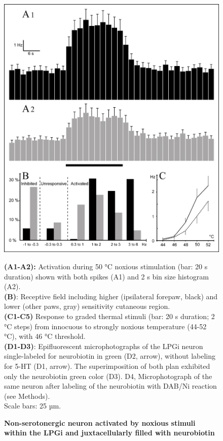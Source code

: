 \documentclass[a4paper,12pt,twoside]{report}
\begin{document}
\begin{figure}[p]

\begin{center}
 \includegraphics[scale=0.9]{Article3-FIG5.jpg} 
\end{center}

\caption[LPGi non-5-HT neuron activated by noxious stimuli]{\textbf{Non-serotonergic neuron activated by noxious stimuli within the LPGi and juxtacellularly filled with neurobiotin}}

{\protect\parbox[t]{18cm}{
\begin{small}
\textbf{(A1-A2):} Activation during 50 °C noxious stimulation (bar: 20 s duration) shown with both spikes (A1) and 2 s bin size histogram (A2).\\
\textbf{(B)}: Receptive field including higher (ipsilateral forepaw, black) and lower (other paws, gray) sensitivity cutaneous region.\\
\textbf{(C1-C5)} Response to graded thermal stimuli (bar: 20 s duration; 2 °C steps) from innocuous to strongly noxious temperature (44-52 °C), with 46 °C threshold.\\
\textbf{(D1-D3)}: Epifluorescent microphotographs of the LPGi neuron single-labeled for neurobiotin in green (D2, arrow), without labeling for 5-HT (D1, arrow). The superimposition of both plan exhibited only the neurobiotin green color (D3). D4, Microphotograph of the same neuron after labeling of the neurobiotin with DAB/Ni reaction (see Methods).\\ 
Scale bars: 25 µm.
\end{small}}}

\label{Article3-FIG5}

\end{figure}
\end{document}
